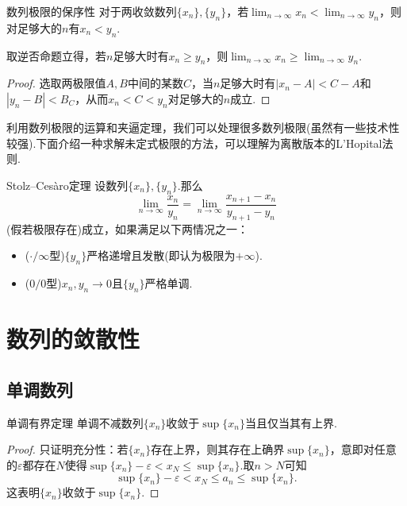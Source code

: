 \documentclass[lang=cn, zihao=5]{elegantbook}
\begin{document}
\begin{theorem}{数列极限的保序性}
	对于两收敛数列$\{ x_n \},\{ y_n \}$，若$\lim_{n \to \infty} x_n < \lim_{n \to \infty} y_n$，则对足够大的$n$有$x_n<y_n$.
\end{theorem}
\begin{remark}
	取逆否命题立得，若$n$足够大时有$x_n \geq y_n$，则$\lim_{n \to \infty} x_n \geq \lim_{n \to \infty} y_n$.
\end{remark}
\begin{proof}
	选取两极限值$A,B$中间的某数$C$，当$n$足够大时有$|x_n-A|<C-A$和$|y_n-B|<B_C$，从而$x_n<C<y_n$对足够大的$n$成立.
\end{proof}

利用数列极限的运算和夹逼定理，我们可以处理很多数列极限(虽然有一些技术性较强).下面介绍一种求解未定式极限的方法，可以理解为离散版本的L'Hopital法则.

\begin{theorem}{Stolz–Cesàro定理}
	设数列$\{ x_n \},\{ y_n \}$.那么$$\lim_{n\to \infty} \frac{x_n}{y_n} = \lim_{n\to \infty} \frac{x_{n+1}-x_n}{y_{n+1}-y_n}$$(假若极限存在)成立，如果满足以下两情况之一：
	\begin{itemize}
		\item ($\cdot / \infty$型)$\{ y_n \}$严格递增且发散(即认为极限为$+\infty$).
		\item ($0/0$型)$x_n,y_n \to 0$且$\{ y_n \}$严格单调.
	\end{itemize}
\end{theorem}

\section{数列的敛散性}

\subsection{单调数列}

\begin{theorem}{单调有界定理}
	单调不减数列$\{ x_n \}$收敛于$\sup \{ x_n \}$当且仅当其有上界.
\end{theorem}
\begin{proof}
	只证明充分性：若$\{ x_n \}$存在上界，则其存在上确界$\sup \{ x_n \}$，意即对任意的$\varepsilon$都存在$N$使得$\sup \{x_n\}-\varepsilon < x_N \leq \sup \{ x_n \}$.取$n>N$可知$$\sup \{x_n\}-\varepsilon < x_N \leq a_n \leq \sup \{ x_n \}.$$
	这表明$\{ x_n \}$收敛于$\sup \{ x_n \}$.
\end{proof}
\end{document}
